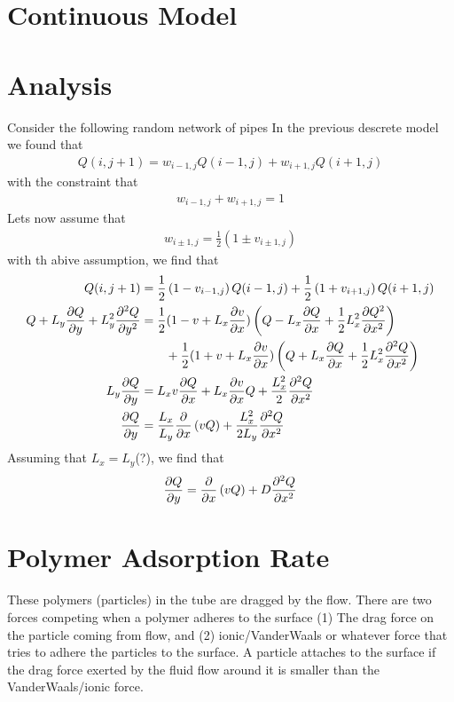 \section{Continuous Model}
%
\section{Analysis}
%
Consider the following random network of pipes
%
In the previous descrete model we found that
%
\begin{align}
  Q(i,j+1) = w_{i-1,j} Q(i-1,j) + w_{i+1,j} Q(i+1,j) 
\end{align}
%
with the constraint that
%
\begin{align}
  w_{i-1,j} + w_{i+1,j} = 1
\end{align}
%
Lets now assume that
%
\begin{align}
  w_{i\pm 1,j}= \frac{1}{2}( 1 \pm v_{i\pm 1,j})
\end{align}
%
with th abive assumption, we find that
%
\begin{align}
  Q(i,j+1) & = \frac{1}{2} \left( 1 - v_{i- 1,j}\right) Q(i-1,j) + \frac{1}{2} \left( 1 + v_{i+ 1,j}\right) Q(i+1,j)  \\
  Q + L_y \frac{\partial Q}{\partial y } + L^2_y \frac{\partial^{2}Q}{\partial y^2}  & = \frac{1}{2} (1-v + L_x \frac{\partial v}{\partial x}  ) \left( Q - L_x \frac{\partial Q}{\partial x} +   \frac{1}{2} L_x^2 \frac{\partial Q^2}{\partial x^2}\right) \nonumber\\
 & \qquad   +\frac{1}{2}  (1+v + L_x \frac{\partial v}{\partial x} )\left( Q + L_x \frac{\partial Q}{\partial x} + \frac{1}{2}L_x^2 \frac{\partial^2 Q}{\partial x^2} \right)  \\
  L_y \frac{\partial Q}{\partial y } & = L_x v \frac{\partial Q}{\partial x} + L_x \frac{\partial v}{\partial x} Q + \frac{L^2_x}{2} \frac{\partial^{2}Q}{\partial x^2}  \\
  \frac{\partial Q}{\partial y}    & = \frac{L_{x}}{L_{y}} \frac{\partial }{\partial x} \left( v Q \right)  + \frac{L^2_x}{2L_y} \frac{\partial^{2}Q}{\partial x^2}  
\end{align}
%
Assuming that $L_x = L_y $(?), we find that
%
\begin{align}
  \frac{\partial Q}{\partial y}  = \frac{\partial}{\partial x} \left( v Q\right) + D \frac{\partial^{2} Q}{\partial x^2}  
\end{align}



\section{Polymer Adsorption Rate}
%
These polymers (particles) in the tube are dragged by the flow. There are two forces competing when a polymer adheres to the surface (1) The drag force on the particle coming from flow, and (2) ionic/VanderWaals or whatever force that tries to adhere the particles to the surface. A particle attaches to the surface if the drag force exerted by the fluid flow around it is smaller than the VanderWaals/ionic force. 


